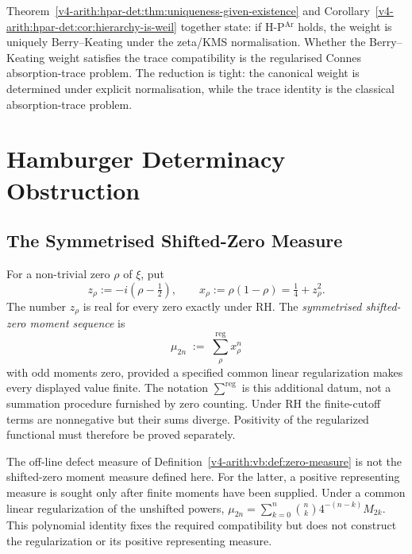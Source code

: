 \begin{remark}
\label{v4-arith:hpar-det:rem:weight-does-not-close}
Theorem~\ref{v4-arith:hpar-det:thm:uniqueness-given-existence} and
Corollary~\ref{v4-arith:hpar-det:cor:hierarchy-is-weil} together state: if
H-P\(^{\mathrm{Ar}}\) holds, the weight is uniquely Berry--Keating
under the zeta/KMS normalisation. Whether the Berry--Keating
weight satisfies the trace compatibility is the
regularised Connes absorption-trace problem. The reduction is
tight: the canonical weight is determined under explicit
normalisation, while the trace identity is the classical
absorption-trace problem.
\end{remark}

\section{Hamburger Determinacy Obstruction}
\label{v4-arith:hpar-det:determinacy}

\subsection{The Symmetrised Shifted-Zero Measure}
\label{v4-arith:hpar-det:symmetrised-measure}

\begin{definition}
\label{v4-arith:hpar-det:def:shifted-moments}
For a non-trivial zero \(\rho\) of \(\xi\),
put
\[
z_{\rho}:=-i(\rho-\tfrac12),\qquad x_{\rho}:=\rho(1-\rho)
       =\tfrac14+z_{\rho}^{2}.
\]
The number \(z_{\rho}\) is real for every zero exactly under RH. The
\emph{symmetrised shifted-zero moment sequence} is
\begin{equation}
\label{v4-arith:hpar-det:eq:mu-2n}
\mu_{2n}\;:=\;\sum_{\rho}^{\mathrm{reg}}x_{\rho}^{n}
\end{equation}
with odd moments zero, provided a specified common linear
regularization makes every displayed value finite. The notation
\(\sum^{\mathrm{reg}}\) is this additional datum, not a summation
procedure furnished by zero counting. Under RH the finite-cutoff
terms are nonnegative but their sums diverge. Positivity of the
regularized functional must therefore be proved separately.
\end{definition}

\begin{remark}
\label{v4-arith:hpar-det:rem:measure-relation}
The off-line defect measure of
Definition~\ref{v4-arith:vb:def:zero-measure} is not the shifted-zero
moment measure defined here. For the latter, a positive representing
measure is sought only after finite moments have been supplied.
Under a common linear regularization of the unshifted powers,
\(\mu_{2n}=\sum_{k=0}^n\binom nk4^{-(n-k)}M_{2k}\).
This polynomial identity fixes the required compatibility but does
not construct the regularization or its positive representing measure.
\end{remark}


